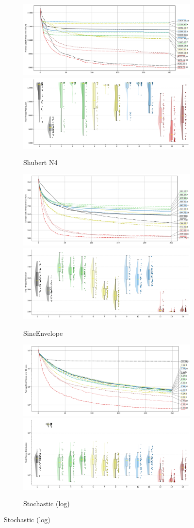 \begin{figure}[p]
\begin{subfigure}{1\textwidth}
    \centering
    \includegraphics[width=.49\textwidth]{Figures/results/1000/Shubert_N4_All_selected_algorithms_dim1000_annot_legend.png}
    \includegraphics[width=.49\textwidth]{Figures/results/1000/Shubert_N4_all_dim1000_raincloud_vertical.png}
    \caption{Shubert N4}
\end{subfigure}

\begin{subfigure}{1\textwidth}
    \centering
    \includegraphics[width=.49\textwidth]{Figures/results/1000/SineEnvelope_All_selected_algorithms_dim1000_annot_legend.png}
    \includegraphics[width=.49\textwidth]{Figures/results/1000/SineEnvelope_all_dim1000_raincloud_vertical.png}
    \caption{SineEnvelope}
\end{subfigure}

\begin{subfigure}{1\textwidth}
    \centering
    \includegraphics[width=.49\textwidth]{Figures/results/1000/Stochastic_All_selected_algorithms_dim1000_annot_legend.png}
    \includegraphics[width=.49\textwidth]{Figures/results/1000/Stochastic_all_dim1000_raincloud_vertical.png}
    \caption{Stochastic (log)}
\end{subfigure}



\end{figure}
